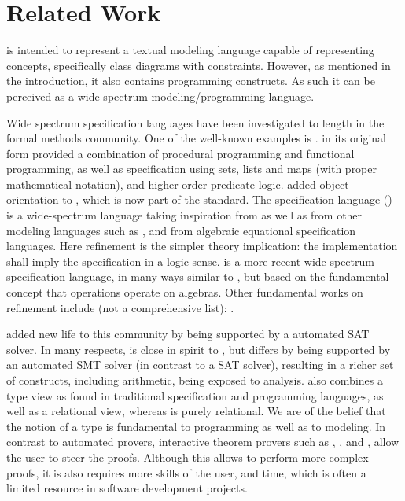 
\section{Related Work}
\label{sec:related-work}

\Klang{} is intended to represent a textual modeling language capable
of representing \sysml{} concepts, specifically class diagrams with
constraints.  However, as mentioned in the introduction, it also
contains programming constructs.  As such it can be perceived as a
wide-spectrum modeling/programming language.

Wide spectrum specification languages have been investigated to length
in the formal methods community. One of the well-known examples is
\vdm{} \cite{vdm78,bjoerner-jones-82,jones90,jones-shaw-90}. \vdm{} in
its original form \cite{vdm78} provided a combination of procedural
programming and functional programming, as well as specification using
sets, lists and maps (with proper mathematical notation), and
higher-order predicate logic. \vdmpp{} \cite{vdmplusplus05} added
object-orientation to \vdm{}, which is now part of the \vdm{}
standard. The \raiselang{} specification language (\rsl{})
\cite{raise92} is a wide-spectrum language taking inspiration from
\vdm{} as well as from other modeling languages such as \zlang{}
\cite{spivey-Z-1988}, and from algebraic equational specification
languages. Here refinement is the simpler theory implication: the
implementation shall imply the specification in a logic sense. \asml{}
\cite{asml05} is a more recent wide-spectrum specification language,
in many ways similar to \vdm{}, but based on the fundamental concept
that operations operate on algebras.  Other fundamental works on
refinement include (not a comprehensive list):
\cite{wirth-refinement-71,hoare-sanders-refinement-86,morgan-refinement-94,woodcock-sanders-z-96,back-wright-refinement-98,abrial-eventb-10}.

\alloy{} \cite{jackson-alloy-12} added new life to this community by
being supported by a automated SAT solver. In many respects, \Klang{}
is close in spirit to \alloy{}, but differs by being supported by an
automated SMT solver (in contrast to a SAT solver), resulting in a
richer set of constructs, including arithmetic, being exposed to
analysis. \Klang{} also combines a type view as found in traditional
specification and programming languages, as well as a relational view,
whereas \alloy{} is purely relational. We are of the belief that the
notion of a type is fundamental to programming as well as to
modeling. In contrast to automated provers, interactive theorem
provers such as \pvs{} \cite{cade92-pvs,pvs-website}, \coq{}
\cite{coq-website}, and \isabelle{} \cite{isabelle-website}, allow the
user to steer the proofs.  Although this allows to perform more
complex proofs, it is also requires more skills of the user, and time,
which is often a limited resource in software development projects.

